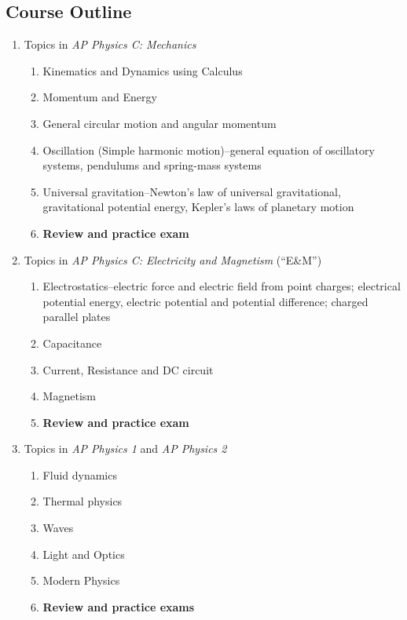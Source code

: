 \documentclass[11pt]{article}
\begin{document}
\subsection*{Course Outline}
\begin{enumerate}[itemsep=.1ex]
\item Topics in \emph{AP Physics C: Mechanics}
  \begin{enumerate}
  \item Kinematics and Dynamics using Calculus
  \item Momentum and Energy
  \item General circular motion and angular momentum
  \item Oscillation (Simple harmonic motion)--general equation of oscillatory
    systems, pendulums and spring-mass systems
  \item Universal gravitation--Newton's law of universal gravitational,
    gravitational potential energy, Kepler's laws of planetary motion
  \item\textbf{Review and practice exam}
  \end{enumerate}
\item Topics in \emph{AP Physics C: Electricity and Magnetism} (``E\&M'')
  \begin{enumerate}
  \item Electrostatics--electric force and electric field from point charges;
    electrical potential energy, electric potential and potential difference;
    charged parallel plates
  \item Capacitance
  \item Current, Resistance and DC circuit
  \item Magnetism
  \item\textbf{Review and practice exam}
  \end{enumerate}
\item Topics in \emph{AP Physics 1} and \emph{AP Physics 2}
  \begin{enumerate}
  \item Fluid dynamics
  \item Thermal physics
  \item Waves
  \item Light and Optics
  \item Modern Physics
  \item\textbf{Review and practice exams}
  \end{enumerate}
\end{enumerate}
\end{document}
